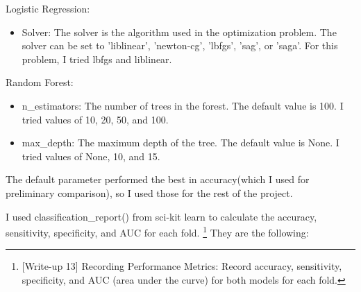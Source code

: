 \documentclass{labReport}
\begin{document}
\begin{multicols*}{2}
    Logistic Regression:
    \begin{itemize}
        \item Solver: The solver is the algorithm used in the optimization problem. The solver can be set to 'liblinear', 'newton-cg', 'lbfgs', 'sag', or 'saga'. For this problem, I tried lbfgs and liblinear.
    \end{itemize}
    Random Forest:
    \begin{itemize}
        \item n\_estimators: The number of trees in the forest. The default value is 100. I tried values of 10, 20, 50, and 100.
        \item max\_depth: The maximum depth of the tree. The default value is None. I tried values of None, 10, and 15.
    \end{itemize}


    The default parameter performed the best in accuracy(which I used for preliminary comparison), so I used those for the rest of the project.


    I used classification\_report() from sci-kit learn to calculate the accuracy, sensitivity, specificity, and AUC for each fold. \footnote{[Write-up 13] Recording Performance Metrics: Record accuracy, sensitivity, specificity, and AUC (area under the curve) for both models for each fold.} They are the following:
\end{multicols*}
\newpage
\end{document}
